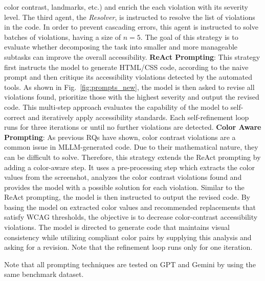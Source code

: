   color contrast, landmarks, etc.) and enrich the each violation with 
  its severity level. The third agent, the \textit{Resolver}, is 
  instructed to resolve the list of violations in the code. In order to 
  prevent cascading errors, this agent is instructed to solve batches 
  of violations, having a size of \(n = 5\). The goal of this strategy 
  is to evaluate whether decomposing the task into smaller and more 
  manageable subtasks can improve the overall accessibility.\newline\newline
\textbf{ReAct Prompting}: 
  This strategy first instructs the model to generate HTML/CSS code, 
  according to the naive prompt and then critique its accessibility
  violations detected by the automated tools. As shown in 
  Fig.~\ref{fig:prompts_new}, the model is then asked to revise
  all violations found, prioritize those with the highest 
  severity and output the revised code.
  This multi-step approach evaluates the capability of the model to 
  self-correct and iteratively apply accessibility standards. 
  Each self-refinement loop runs for three iterations or until 
  no further violations are detected.\newline\newline
\textbf{Color Aware Prompting}: 
  As previous RQs have shown, color contrast violations are a common 
  issue in MLLM-generated code. Due to their mathematical nature, they
  can be difficult to solve. Therefore, this strategy extends the ReAct 
  prompting by adding a color-aware step. It uses a pre-processing 
  step which extracts the color values from the screenshot, analyzes 
  the color contrast violations found and provides the model with a 
  possible solution for each violation. Similar to the ReAct prompting,
  the model is then instructed to output the revised code. 
  By basing the model on extracted color values and recommended 
  replacements that satisfy WCAG thresholds, the objective is to 
  decrease color-contrast accessibility violations. The model is 
  directed to generate code that maintains visual consistency while 
  utilizing compliant color pairs by supplying this analysis and 
  asking for a revision.
  Note that the refinement loop runs only for one iteration.\newline


Note that all prompting techniques are tested on GPT and Gemini by using the 
same benchmark dataset.


